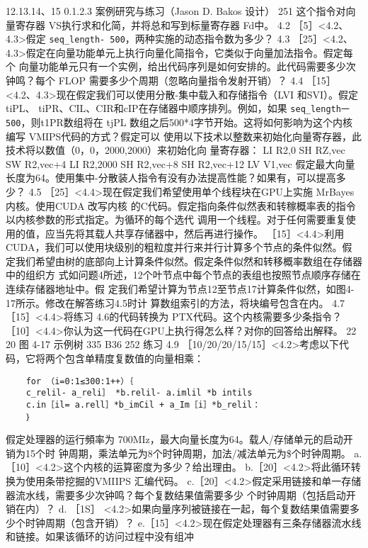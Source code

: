 12.13.14、15
0.1.2.3
案例研究与练习（Jason D. Bakos 设计）
251
这个指令对向量寄存器 VS执行求和化简，并将总和写到标量寄存器 Fd中。
4.2
［5］<4.2、4.3>假定 \verb|seq_length- 500|，两种实施的动态指令数为多少？
4.3
［25］<4.2、4.3>假定在向量功能单元上执行向量化简指令，它类似于向量加法指令。假定每个
向量功能单元只有一个实例，给出代码序列是如何安排的。此代码需要多少次钟鸣？每个 FLOP
需要多少个周期（忽略向量指令发射开销）？
4.4
［15］<4.2、4.3>现在假定我们可以使用分散-集中载入和存储指令（LVI 和SVI）。假定tiPL、
tiPR、CIL、CIR和cIP在存储器中顺序排列。例如，如果 \verb|seq_length一500|，则t1PR数组将在
tjPL 数组之后500*4字节开始。这将如何影响为这个内核编写 VMIPS代码的方式？假定可以
使用以下技术以整数来初始化向量寄存器，此技术将以数值（0，0，2000,2000）来初始化向
量寄存器：
LI R2,0
SH RZ,vec
SW R2,vec+4
LI R2,2000
SH R2,vec+8
SH R2,vec+12
LV V1,vec
假定最大向量长度为64。使用集中-分散装人指令有没有办法提高性能？如果有，可以提高多少？
4.5
［25］<4.4>现在假定我们希望使用单个线程块在GPU上实施 MrBayes 内核。使用CUDA 改写内核
的C代码。假定指向条件似然表和转稼概率表的指令以内核参数的形式指定。为循环的每个选代
调用一个线程。对于任何需要重复使用的值，应当先将其载人共享存储器中，然后再进行操作。
［15］<4.4>利用CUDA，我们可以使用块级别的粗粒度并行来并行计算多个节点的条件似然。假
定我们希望由树的底部向上计算条件似然。假定条件似然和转移概率数组在存储器中的组织方
式如问题4所述，12个叶节点中每个节点的表组也按照节点顺序存储在连续存储器地址中。假
定我们希望计算为节点12至节点17计算条件似然，如图4-17所示。修改在解答练习4.5时计
算数组索引的方法，将块编号包含在内。
4.7
［15］<4.4>将练习 4.6的代码转换为 PTX代码。这个内核需要多少条指令？
［10］<4.4>你认为这一代码在GPU上执行得怎么样？对你的回答给出解释。
22
20
图 4-17
示例树
335
B36
252
练习
4.9 ［10/20/20/15/15］<4.2>考虑以下代码，它将两个包含单精度复数值的向量相乘：
\begin{verbatim}
    for （i=0:1≤300:1++）｛
    c_relil- a_reli］ *b.relil- a.imlil *b intils
    c.in［il= a.rell］*b_imCil + a_Im［i］*b_relil：
    ｝
\end{verbatim}
假定处理器的运行頻率为 700MIz，最大向量长度为64。载人/存储单元的启动开销为15个时
钟周期，乘法单元为8个时钟周期，加法/减法单元为\$个时钟周期。
a.［10］<4.2>这个内核的运算密度为多少？给出理由。
b.［20］<4.2>将此循环转换为使用条带挖掘的VMIIPS 汇编代码。
c.［20］<4.2>假定采用链接和单一存储器流水线，需要多少次钟鸣？每个复数结果值需要多少
个时钟周期（包括启动开销在内）？
d. ［1S］ <4.2>如果向量序列被链接在一起，每个复数结果值需要多少个时钟周期（包含开销）？
e.［15］<4.2>现在假定处理器有三条存储器流水线和链接。如果该循环的访问过程中没有组冲
